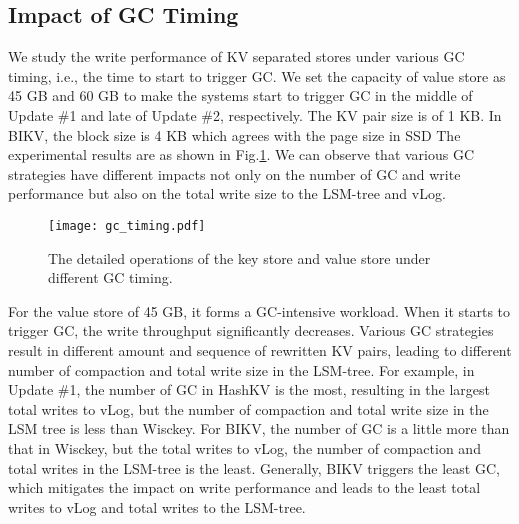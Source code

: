 \documentclass[sigconf]{acmart}
\begin{document}
\subsection{Impact of GC Timing}
We study the write performance of KV separated stores under various GC timing, i.e., the time to start to trigger GC. We set the capacity of value store as 45 GB and 60 GB to make the systems start to trigger GC in the middle of Update \#1 and late of Update \#2, respectively. The KV pair size is of 1 KB. In BIKV, the block size is 4 KB which agrees with the page size in SSD {\color{red}{(SSD page size is not 4KB !! )}} The experimental results are as shown in Fig.\ref{fig:gc}. We can observe that various GC strategies have different impacts not only on the number of GC and write performance but also on the total write size to the LSM-tree and vLog.

\begin{figure}[!t]
	\setlength{\abovecaptionskip}{0.cm}	
	\setlength{\belowcaptionskip}{-0.cm}
	\centering
	\texttt{[image: gc\_timing.pdf]}
	\caption{The detailed operations of the key store and value store under different GC timing.}
	\label{fig:gc}
\end{figure}

For the value store of 45 GB, it forms a GC-intensive workload. When it starts to trigger GC, the write throughput significantly decreases. Various GC strategies result in different amount and sequence of rewritten KV pairs, leading to different number of compaction and total write size in the LSM-tree. For example, in Update \#1, the number of GC in HashKV is the most, resulting in the largest total writes to vLog, but the number of compaction and total write size in the LSM tree is less than Wisckey. For BIKV, the number of GC is a little more than that in Wisckey, but the total writes to vLog, the number of compaction and total writes in the LSM-tree is the least. Generally, BIKV triggers the least GC, which mitigates the impact on write performance and leads to the least total writes to vLog and total writes to the LSM-tree.
\end{document}
